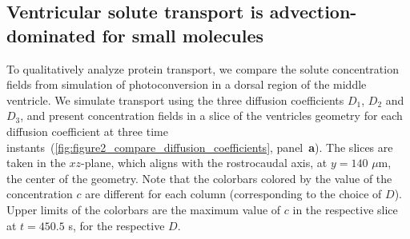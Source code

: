 \documentclass[fleqn]{wlscirep}
\begin{document}
\subsection*{Ventricular solute transport is advection-dominated for small molecules}
To qualitatively analyze protein transport, we compare the solute concentration fields from simulation of photoconversion in a dorsal region of the middle ventricle. We simulate transport using the three diffusion coefficients $D_1$, $D_2$ and $D_3$, and present concentration fields in a slice of the ventricles geometry for each diffusion coefficient at three time instants~(\cref{fig:figure2_compare_diffusion_coefficients}, panel~\textbf{a}). The slices are taken in the $xz$-plane, which aligns with the rostrocaudal axis, at $y=140$ $\mu$m, the center of the geometry. Note that the colorbars colored by the value of the concentration $c$ are different for each column (corresponding to the choice of $D$). Upper limits of the colorbars are the maximum value of $c$ in the respective slice at $t=450.5$ s, for the respective $D$. 
\end{document}
